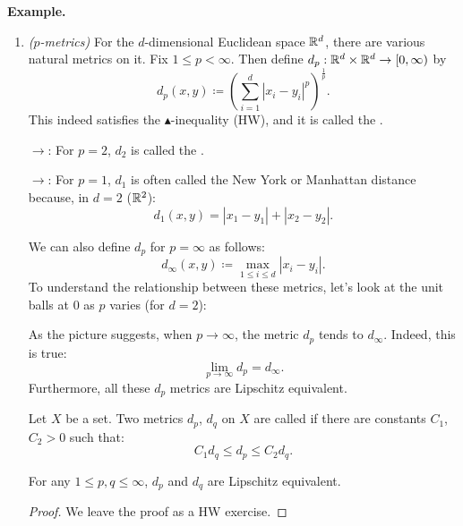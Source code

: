 \documentclass[14pt,oneside]{extarticle}
\newenvironment{example}{
    \par
    \vspace{5pt}
    \noindent\textbf{Example.}
    \begin{tcolorbox}[
        blanker, breakable, left=5mm, parbox=false,
        before upper={\parindent15pt},
        after skip=10pt,
        borderline west={1mm}{0pt}{solarized-magenta!50}]
}{
    \end{tcolorbox}
    \vspace{5pt}
}
\begin{document}
\begin{example}
\begin{enumerate}[label=$\circ$, leftmargin=*, itemsep=1em]
      \item \textit{($p$-metrics)} For the $d$-dimensional Euclidean space $\mathbb{R}^d$, there are various natural metrics on it. Fix $1 \leq p < \infty$. Then define $d_p: \mathbb{R}^d \times \mathbb{R}^d \to [0,\infty)$ by 
      \[d_p(x,y) \coloneqq \left(\sum_{i=1}^{d}|x_i-y_i|^p\right)^{\frac{1}{p}}. \]
      This indeed satisfies the $\blacktriangle$-inequality (HW), and it is called the .

      $\to$: For $p=2$, $d_2$ is called the .
      
      $\to$: For $p=1$, $d_1$ is often called the New York or Manhattan distance because, in $d=2$ ($\mathbb{R}^2$):
      \[d_1(x,y) = |x_1-y_1| +|x_2-y_2|.\]

      \pic

      We can also define $d_p$ for $p=\infty$ as follows: 
      \[d_\infty(x,y) \coloneqq \max_{1\leq i\leq d}|x_i-y_i|.\]
      To understand the relationship between these metrics, let's look at the unit balls at $0$ as $p$ varies (for $d=2$):

      \pic 

      As the picture suggests, when $p \to \infty$, the metric $d_p$ tends to $d_\infty$. Indeed, this is true:
      \[\lim_{p \to \infty}d_p = d_\infty.\]
      Furthermore, all these $d_p$ metrics are Lipschitz equivalent.

  \begin{definition*}
    Let $X$ be a set. Two metrics $d_p$, $d_q$ on $X$ are called  if there are constants $C_1$, $C_2 >0$ such that:
    \[C_1d_q \leq d_p \leq C_2 d_q.\]
  \end{definition*}

  \begin{proposition*}
    For any $1 \leq p, q \leq \infty$, $d_p$ and $d_q$ are Lipschitz equivalent.
  \end{proposition*}
  \begin{proof}
    We leave the proof as a HW exercise.
  \end{proof}


\end{enumerate}
\end{example}
\end{document}
